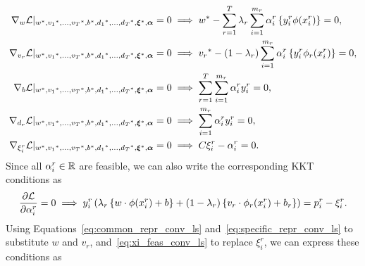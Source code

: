 \begin{align}
    \grad_{{w}} \lagr \vert_{\optim{{w}}, \optim{{v}_1}, \ldots, \optim{{v}_\ntasks}, \optim{b}, \optim{d_1}, \ldots, \optim{d_\ntasks}, \optim{\fv{\xi}}, {\fv{\alpha}}} = 0  &\implies \optim{{w}} - \sum_{r= 1}^\ntasks \lambda_r \sum_{i=1}^{m_r} {\alpha_i^r} \left\lbrace y_i^r \phi(x_i^r) \right\rbrace = 0 , \label{eq:common_repr_conv_ls} \\
    \grad_{{v}_r} \lagr \vert_{\optim{{w}}, \optim{{v}_1}, \ldots, \optim{{v}_\ntasks}, \optim{b}, \optim{d_1}, \ldots, \optim{d_\ntasks}, \optim{\fv{\xi}}, {\fv{\alpha}}} = 0 &\implies \optim{{v}_r} - (1 - \lambda_r) \sum_{i=1}^{m_r} {\alpha_i^r} \left\lbrace y_i^r \phi_r(x_i^r) \right\rbrace = 0 , \label{eq:specific_repr_conv_ls} \\
    \grad_{b} \lagr \vert_{\optim{{w}}, \optim{{v}_1}, \ldots, \optim{{v}_\ntasks}, \optim{b}, \optim{d_1}, \ldots, \optim{d_\ntasks}, \optim{\fv{\xi}}, {\fv{\alpha}}} = 0  &\implies \sum_{r= 1}^T \sum_{i=1}^{m_r} {\alpha_i^r} y_i^r = 0 , \label{eq:specific_eqconstr_conv_ls}  \\
    \grad_{{d}_r} \lagr \vert_{\optim{{w}}, \optim{{v}_1}, \ldots, \optim{{v}_\ntasks}, \optim{b}, \optim{d_1}, \ldots, \optim{d_\ntasks}, \optim{\fv{\xi}}, {\fv{\alpha}}} = 0 &\implies \sum_{i=1}^{m_r} {\alpha_i^r} y_i^r = 0 , \label{eq:common_eqconstr_conv_ls} \\
    \grad_{\xi_i^r} \lagr \vert_{\optim{{w}}, \optim{{v}_1}, \ldots, \optim{{v}_\ntasks}, \optim{b}, \optim{d_1}, \ldots, \optim{d_\ntasks}, \optim{\fv{\xi}}, {\fv{\alpha}}} = 0 &\implies C \xi_i^r - {\alpha_i^r} = 0 . \label{eq:xi_feas_conv_ls}
\end{align}
Since all $\alpha_i^r \in \mathbb{R}$ are feasible, we can also write the corresponding KKT conditions as
\begin{equation}
    \nonumber
    \frac{\partial \mathcal{L}}{\partial \alpha_i^r} = 0 \implies y_{i}^r \left(\lambda_r \left\lbrace {w} \cdot \phi(x_{i}^r) + b  \right\rbrace + (1 - \lambda_r) \left\lbrace {v}_r \cdot \phi_r(x_{i}^r) + b_r \right\rbrace  \right) = p_{i}^r - \xi_{i}^r  .
\end{equation}
Using Equations~\eqref{eq:common_repr_conv_ls} and~\eqref{eq:specific_repr_conv_ls} to substitute $w$ and $v_r$, and~\eqref{eq:xi_feas_conv_ls} to replace $\xi_i^r$, we can express these conditions as 
